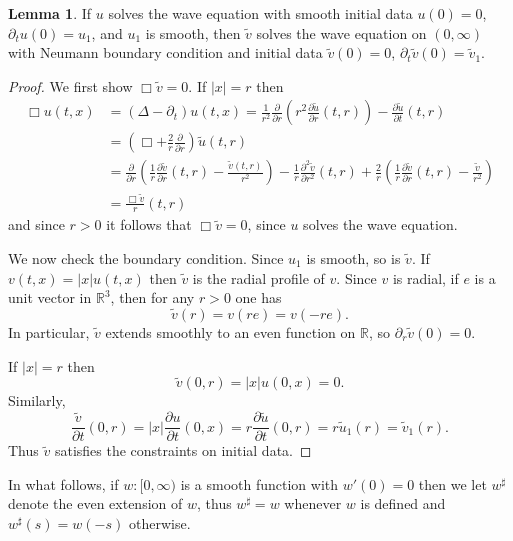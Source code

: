 \documentclass[10pt]{article}
\newcommand{\RR}{\mathbb{R}}
\theoremstyle{definition}
\newtheorem{lemma}{Lemma}[exer]
\begin{document}
\begin{lemma}
\label{Neumann solution}
If $u$ solves the wave equation with smooth initial data $u(0) = 0$, $\partial_t u(0) = u_1$, and $u_1$ is smooth, then $\tilde v$ solves the wave equation on $(0, \infty)$ with Neumann boundary condition and initial data $\tilde v(0) = 0$, $\partial_t \tilde v(0) = \tilde v_1$.
\end{lemma}
\begin{proof}
We first show $\Box \tilde v = 0$. If $|x| = r$ then
\begin{align*}
\Box u(t, x) &= (\Delta - \partial_t) u(t, x) = \frac{1}{r^2} \frac{\partial}{\partial r} \left(r^2 \frac{\partial \tilde u}{\partial r}(t, r)\right) - \frac{\partial \tilde u}{\partial t}(t, r)\\
&= \left(\Box + \frac{2}{r} \frac{\partial}{\partial r}\right) \tilde u(t, r)\\
&= \frac{\partial}{\partial r} \left(\frac{1}{r} \frac{\partial \tilde v}{\partial r}(t, r) - \frac{\tilde v(t, r)}{r^2} \right) - \frac{1}{r} \frac{\partial^2 \tilde v}{\partial r^2}(t, r) +
\frac{2}{r}\left(\frac{1}{r} \frac{\partial \tilde v}{\partial r}(t, r) - \frac{\tilde v}{r^2}\right)\\
&= \frac{\Box \tilde v}{r}(t, r)
\end{align*}
and since $r > 0$ it follows that $\Box \tilde v = 0$, since $u$ solves the wave equation.

We now check the boundary condition.
Since $u_1$ is smooth, so is $\tilde v$.
If $v(t, x) = |x| u(t, x)$ then $\tilde v$ is the radial profile of $v$.
Since $v$ is radial, if $e$ is a unit vector in $\RR^3$, then for any $r > 0$ one has
$$\tilde v(r) = v(re) = v(-re).$$
In particular, $\tilde v$ extends smoothly to an even function on $\RR$, so $\partial_r \tilde v(0) = 0$.

If $|x| = r$ then
$$\tilde v(0, r) = |x| u(0, x) = 0.$$
Similarly,
$$\frac{\tilde v}{\partial t}(0, r) = |x| \frac{\partial u}{\partial t}(0, x) = r \frac{\partial \tilde u}{\partial t}(0, r) = r\tilde u_1(r) = \tilde v_1(r).$$
Thus $\tilde v$ satisfies the constraints on initial data.
\end{proof}

In what follows, if $w: [0, \infty)$ is a smooth function with $w'(0) = 0$ then we let $w^\sharp$ denote the even extension of $w$, thus $w^\sharp = w$ whenever $w$ is defined and $w^\sharp(s) = w(-s)$ otherwise.
\end{document}
